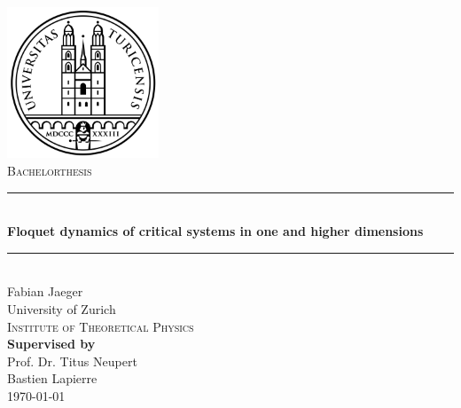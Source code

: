 \documentclass[11pt, a4paper, oneside]{book}
\theoremstyle{definition} %
\begin{document}
\begin{titlepage}
    \centering
    \vspace*{0.5 cm}
    \includegraphics[width =0.34\textwidth]{UZH2.png}\\[1.2 cm]
      \textsc{\Large \textsc{Bachelorthesis}}\\[0.5 cm]

    \rule{\linewidth}{0.3 mm} \\[0.4cm]
    { \Large \bfseries Floquet dynamics of critical systems in one and higher dimensions}\\[0.3 cm]
    \rule{\linewidth}{0.3 mm} \\[1.5 cm]

  
    {\Large Fabian Jaeger}\\[2 cm] 
    
    
    		University of Zurich \\
             \textsc{Institute of Theoretical Physics} \\[1.5cm]
        
             	
    
    
    {\textbf{Supervised by}} \\[0.2cm]
   {\large  Prof. Dr. Titus Neupert} \\
   {\large Bastien Lapierre} \\ [2cm]
    
    {\large \today}\\[2 cm]
 
    \vfill
%    
    
\end{titlepage}
\end{document}
